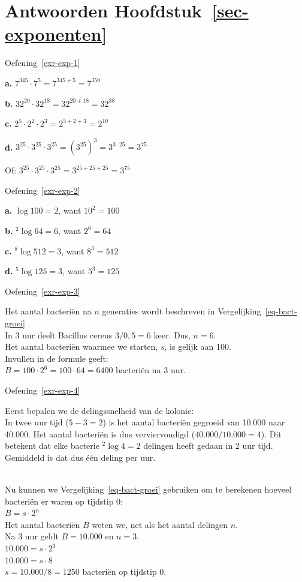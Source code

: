 \documentclass[
  a4paper,
]{scrbook}
\theoremstyle{definition}
\theoremstyle{remark}
\begin{document}
\hypertarget{antwoorden-sec-exponenten}{%
\section*{\texorpdfstring{Antwoorden
Hoofdstuk~\ref{sec-exponenten}}{Antwoorden Hoofdstuk~}}\label{antwoorden-sec-exponenten}}


Oefening~\ref{exr-exp-1}

\textbf{a.} \(7^{345} \cdot 7^5 = 7^{345 + 5} = 7^{350}\)

\textbf{b.} \(32^{20} \cdot 32^{18} = 32^{20 + 18} = 32^{38}\)

\textbf{c.} \(2^5 \cdot 2^2 \cdot 2^3 = 2^{5 + 2 + 3} = 2^{10}\)

\textbf{d.}
\(3^{25} \cdot 3^{25} \cdot 3^{25} = (3^{25})^3 = 3^{3 \cdot 25} = 3^{75}\)

Of: \(3^{25} \cdot 3^{25} \cdot 3^{25} = 3^{25+25+25} = 3^{75}\)

Oefening~\ref{exr-exp-2}

\textbf{a.} \(\log{100} = 2\), want \(10^2 = 100\)

\textbf{b.} \(^2\log{64} = 6\), want \(2^6 = 64\)

\textbf{c.} \(^8\log{512} = 3\), want \(8^3 = 512\)

\textbf{d.} \(^5\log{125} = 3\), want \(5^3 = 125\)

Oefening~\ref{exr-exp-3}

Het aantal bacteriën na \(n\) generaties wordt beschreven in
Vergelijking~\ref{eq-bact-groei} .\\
In 3 uur deelt Bacillus cereus \(3 / 0,5 = 6\) keer. Dus, \(n=6\).\\
Het aantal bacteriën waarmee we starten, \(s\), is gelijk aan 100.\\
Invullen in de formule geeft:\\
\(B = 100 \cdot 2^6 = 100 \cdot 64 = 6400\) bacteriën na 3 uur.

Oefening~\ref{exr-exp-4}

Eerst bepalen we de delingssnelheid van de kolonie:\\
In twee uur tijd (\(5 - 3 = 2\)) is het aantal bacteriën gegroeid van
10.000 naar 40.000. Het aantal bacteriën is dus verviervoudigd
(\(40.000/10.000=4\)). Dit betekent dat elke bacterie \(^2\log{4} = 2\)
delingen heeft gedaan in 2 uur tijd. Gemiddeld is dat dus één deling per
uur.\\
\strut \\
Nu kunnen we Vergelijking~\ref{eq-bact-groei} gebruiken om te berekenen
hoeveel bacteriën er waren op tijdstip 0:\\
\(B = s\cdot2^n\)\\
Het aantal bacteriën \(B\) weten we, net als het aantal delingen
\(n\).\\
Na 3 uur geldt \(B = 10.000\) en \(n = 3\).\\
\(10.000 = s\cdot2^3\)\\
\(10.000 = s\cdot8\)\\
\(s = 10.000 / 8 = 1250\) bacteriën op tijdstip 0.
\end{document}
